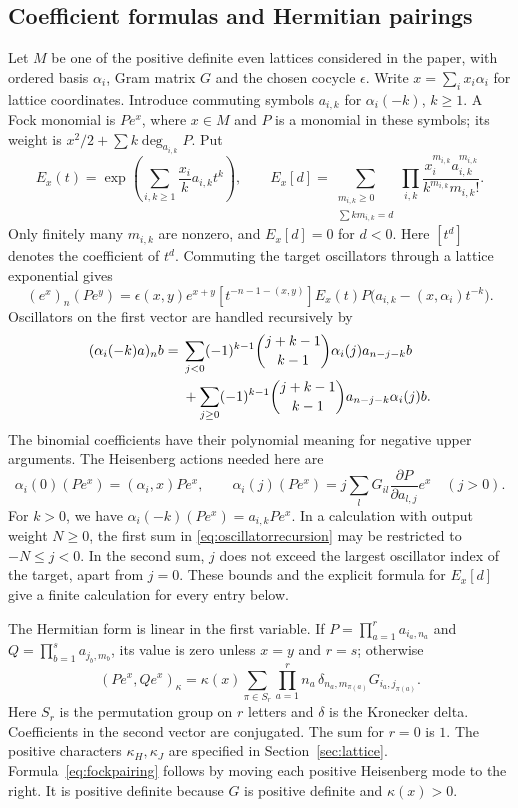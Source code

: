 \documentclass[11pt,reqno]{amsart}
\theoremstyle{definition}\newtheorem{definition}[theorem]{Definition}
\theoremstyle{remark}\newtheorem{remark}[theorem]{Remark}
\numberwithin{equation}{section}
\begin{document}
\subsection{Coefficient formulas and Hermitian pairings}\label{app:kernel}
Let $M$ be one of the positive definite even lattices considered in the paper, with ordered basis $\alpha_i$, Gram matrix $G$ and the chosen cocycle $\epsilon$. Write $x=\sum_i x_i\alpha_i$ for lattice coordinates. Introduce commuting symbols $a_{i,k}$ for $\alpha_i(-k)$, $k\ge1$. A Fock monomial is $Pe^x$, where $x\in M$ and $P$ is a monomial in these symbols; its weight is $x^2/2+\sum k\deg_{a_{i,k}}P$. Put
\[
 E_x(t)=\exp\!\left(\sum_{i,k\ge1}\frac{x_i}{k}a_{i,k}t^k\right),\qquad
 E_x[d]=\sum_{\substack{m_{i,k}\ge0\\\sum k m_{i,k}=d}}
 \prod_{i,k}\frac{x_i^{m_{i,k}}a_{i,k}^{m_{i,k}}}{k^{m_{i,k}}m_{i,k}!}.
\]
Only finitely many $m_{i,k}$ are nonzero, and $E_x[d]=0$ for $d<0$. Here $[t^d]$ denotes the coefficient of $t^d$. Commuting the target oscillators through a lattice exponential gives
\begin{equation}\label{eq:extraction}
 (e^x)_n(Pe^y)=\epsilon(x,y)e^{x+y}
 [t^{-n-1-(x,y)}]E_x(t)
 P\bigl(a_{i,k}-(x,\alpha_i)t^{-k}\bigr).
\end{equation}
Oscillators on the first vector are handled recursively by
\begin{align}\label{eq:oscillatorrecursion}
 (\alpha_i(-k)a)_n b={}&
 \sum_{j<0}(-1)^{k-1}\binom{j+k-1}{k-1}
       \alpha_i(j)a_{n-j-k}b\notag\\
 &+\sum_{j\ge0}(-1)^{k-1}\binom{j+k-1}{k-1}
       a_{n-j-k}\alpha_i(j)b.
\end{align}
The binomial coefficients have their polynomial meaning for negative upper arguments. The Heisenberg actions needed here are
\[
 \alpha_i(0)(Pe^x)=(\alpha_i,x)Pe^x,\qquad
 \alpha_i(j)(Pe^x)=j\sum_lG_{il}\frac{\partial P}{\partial a_{l,j}}e^x
 \quad(j>0).
\]
For $k>0$, we have $\alpha_i(-k)(Pe^x)=a_{i,k}Pe^x$. In a calculation with output weight $N\ge0$, the first sum in \eqref{eq:oscillatorrecursion} may be restricted to $-N\le j<0$. In the second sum, $j$ does not exceed the largest oscillator index of the target, apart from $j=0$. These bounds and the explicit formula for $E_x[d]$ give a finite calculation for every entry below.

The Hermitian form is linear in the first variable. If
$P=\prod_{a=1}^r a_{i_a,n_a}$ and $Q=\prod_{b=1}^s a_{j_b,m_b}$, its value is zero unless $x=y$ and $r=s$; otherwise
\begin{equation}\label{eq:fockpairing}
 (Pe^x,Qe^x)_\kappa=
 \kappa(x)\sum_{\pi\in S_r}\prod_{a=1}^r
 n_a\,\delta_{n_a,m_{\pi(a)}}G_{i_a,j_{\pi(a)}}.
\end{equation}
Here $S_r$ is the permutation group on $r$ letters and $\delta$ is the Kronecker delta. Coefficients in the second vector are conjugated. The sum for $r=0$ is $1$. The positive characters $\kappa_H,\kappa_J$ are specified in Section~\ref{sec:lattice}.
Formula~\eqref{eq:fockpairing} follows by moving each positive Heisenberg mode to the right. It is positive definite because $G$ is positive definite and $\kappa(x)>0$.
\end{document}
